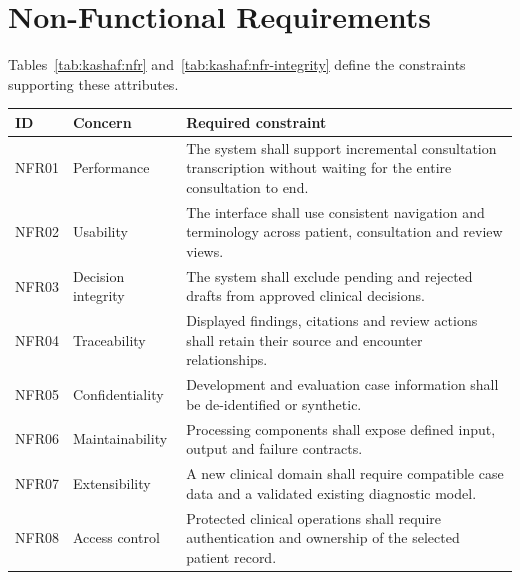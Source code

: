 \section{Non-Functional Requirements}

Tables~\ref{tab:kashaf:nfr} and~\ref{tab:kashaf:nfr-integrity} define the constraints supporting these attributes.

\begin{reporttable}
\centering
\small
\caption{Non-functional requirements for interaction, traceability and component quality.}
\label{tab:kashaf:nfr}
\begin{tabular}{|p{}|p{}|p{}|}
\hline
ID & Concern & Required constraint \\ \hline
NFR01 & Performance & The system shall support incremental consultation transcription without waiting for the entire consultation to end. \\ \hline
NFR02 & Usability & The interface shall use consistent navigation and terminology across patient, consultation and review views. \\ \hline
NFR03 & Decision integrity & The system shall exclude pending and rejected drafts from approved clinical decisions. \\ \hline
NFR04 & Traceability & Displayed findings, citations and review actions shall retain their source and encounter relationships. \\ \hline
NFR05 & Confidentiality & Development and evaluation case information shall be de-identified or synthetic. \\ \hline
NFR06 & Maintainability & Processing components shall expose defined input, output and failure contracts. \\ \hline
NFR07 & Extensibility & A new clinical domain shall require compatible case data and a validated existing diagnostic model. \\ \hline
NFR08 & Access control & Protected clinical operations shall require authentication and ownership of the selected patient record. \\ \hline
\end{tabular}
\end{reporttable}

